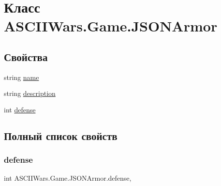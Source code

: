 \hypertarget{class_a_s_c_i_i_wars_1_1_game_1_1_j_s_o_n_armor}{}\section{Класс A\+S\+C\+I\+I\+Wars.\+Game.\+J\+S\+O\+N\+Armor}
\label{class_a_s_c_i_i_wars_1_1_game_1_1_j_s_o_n_armor}
\subsection*{Свойства}
\begin{DoxyCompactItemize}
\item 
string \hyperlink{class_a_s_c_i_i_wars_1_1_game_1_1_j_s_o_n_armor_a5f29078c07ea3199d5e0e2aa48e5dd90}{name}
\item 
string \hyperlink{class_a_s_c_i_i_wars_1_1_game_1_1_j_s_o_n_armor_a078af0e88ca64ad7bad94897eb37ef0a}{description}
\item 
int \hyperlink{class_a_s_c_i_i_wars_1_1_game_1_1_j_s_o_n_armor_ab31e905e8ac9355508fd6476b414b301}{defense}
\end{DoxyCompactItemize}


\subsection{Полный список свойств}
\hypertarget{class_a_s_c_i_i_wars_1_1_game_1_1_j_s_o_n_armor_ab31e905e8ac9355508fd6476b414b301}{}\label{class_a_s_c_i_i_wars_1_1_game_1_1_j_s_o_n_armor_ab31e905e8ac9355508fd6476b414b301} 
\subsubsection{\texorpdfstring{defense}{defense}}
{\footnotesize\ttfamily int A\+S\+C\+I\+I\+Wars.\+Game.\+J\+S\+O\+N\+Armor.\+defense\hspace{0.3cm}{\ttfamily [get]}, {\ttfamily [set]}}

